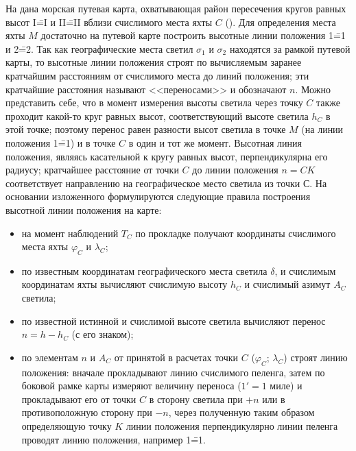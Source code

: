 На  дана морская путевая карта, охватывающая район
пересечения кругов равных высот I\==I и II\==II вблизи счислимого
места яхты $C$ (). Для определения места яхты $M$ достаточно
на путевой карте построить высотные линии положения 1\==1 и 2\==2. Так
как географические места светил $\sigma_1$ и $\sigma_2$ находятся за
рамкой путевой карты, то высотные линии положения строят по
вычисляемым заранее кратчайшим расстояниям от счислимого места до
линий положения; эти кратчайшие расстояния называют <<переносами>> и
обозначают $n$. Можно представить себе, что в момент измерения высоты
светила через точку $C$ также проходит какой-то круг равных высот,
соответствующий высоте светила $h_C$ в этой точке; поэтому перенос
равен разности высот светила в точке $M$ (на линии положения 1\==1) и
в точке $C$ в один и тот же момент. Высотная линия положения, являясь
касательной к кругу равных высот, перпендикулярна его радиусу;
кратчайшее расстояние от точки $C$ до линии положения $n = CK$
соответствует направлению на географическое место светила из точки
С. На основании изложенного формулируются следующие правила построения
высотной линии положения на карте:
\begin{itemize}
\item на момент наблюдений $T_C$ по прокладке получают координаты
  счислимого места яхты $\varphi_C$ и $\lambda_C$;
\item по известным координатам географического места светила $\delta$, \tGR и
  счислимым координатам яхты вычисляют счислимую высоту $h_C$ и счислимый
  азимут $A_C$ светила;
\item по известной истинной и счислимой высоте светила вычисляют
  перенос $n = h - h_C$ (с его знаком);
\item по элементам $n$ и $A_C$ от принятой в расчетах точки $C$
  ($\varphi_C$; $\lambda_C$) строят линию положения: вначале
  прокладывают линию счислимого пеленга, затем по боковой рамке карты
  измеряют величину переноса ($1' = 1$ миле) и прокладывают его от
  точки $C$ в сторону светила при $+n$ или в противоположную сторону
  при $-n$, через полученную таким образом определяющую точку $K$
  линии положения перпендикулярно линии пеленга проводят линию
  положения, например 1\==1.
\end{itemize}

